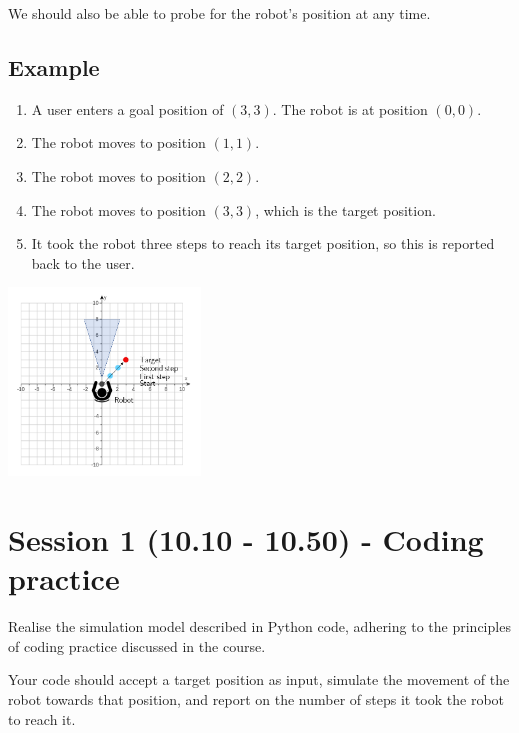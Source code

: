 \documentclass{article}
\begin{document}
We should also be able to probe for the robot's position at any time.

\subsection{Example}

\begin{enumerate}

    \item A user enters a goal position of $(3, 3)$. The robot is at position $(0, 0)$.

    \item The robot moves to position $(1, 1)$.

    \item The robot moves to position $(2, 2)$.

    \item The robot moves to position $(3, 3)$, which is the target position.

    \item It took the robot three steps to reach its target position, so this is reported back to the user.

\end{enumerate}

\begin{center}
  \includegraphics[height=5cm]{movement.png}
\end{center}

\section{Session 1 (10.10 - 10.50) - Coding practice}

Realise the simulation model described in Python code, adhering to the principles of coding practice discussed in the course.

Your code should accept a target position as input, simulate the movement of the robot towards that position, and report on the number of steps it took the robot to reach it.
\end{document}
